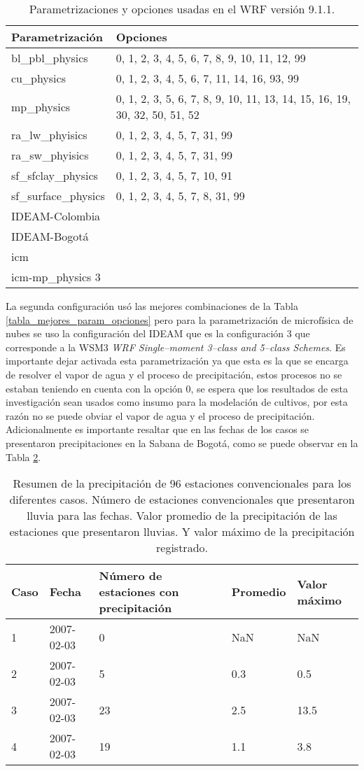 \begin{itemize}
\begin{table}[H]
\caption{Parametrizaciones y opciones usadas en el WRF versión 9.1.1.}
\label{tabla_parametrizacion_opciones_2}
\begin{tabular}{lp{8cm}}
Parametrización & Opciones \\ \hline
bl\_pbl\_physics & 0, 1, 2, 3, 4, 5, 6, 7, 8, 9, 10, 11, 12, 99 \\ %
cu\_physics      & 0, 1, 2, 3, 4, 5, 6, 7, 11, 14, 16, 93, 99 \\ %
mp\_physics      & 0, 1, 2, 3, 5, 6, 7, 8, 9, 10, 11, 13, 14, 15, 16, 19, 30, 32, 50, 51, 52 \\%
ra\_lw\_phyisics & 0, 1, 2, 3, 4, 5, 7, 31, 99 \\%
ra\_sw\_phyisics & 0, 1, 2, 3, 4, 5, 7, 31, 99 \\%
sf\_sfclay\_physics & 0, 1, 2, 3, 4, 5, 7, 10, 91\\ %
sf\_surface\_physics & 0, 1, 2, 3, 4, 5, 7, 8, 31, 99\\ %
IDEAM-Colombia & \\
IDEAM-Bogotá & \\ 
icm & \\ 
icm-mp\_physics 3 &
\end{tabular}
\end{table}

La segunda configuración usó las mejores combinaciones de la Tabla \ref{tabla_mejores_param_opciones} pero para la parametrización de microfísica de nubes se uso la configuración del IDEAM que es la configuración 3 que corresponde a la WSM3 \textit{WRF Single–moment 3–class and 5–class Schemes}. Es importante dejar activada esta parametrización ya que esta es la que se encarga de resolver el vapor de agua y el proceso de precipitación, estos procesos no se estaban teniendo en cuenta con la opción 0, se espera que los resultados de esta investigación sean usados como insumo para la modelación de cultivos, por esta razón no se puede obviar el vapor de agua y el proceso de precipitación. Adicionalmente es importante resaltar que en las fechas de los casos se presentaron precipitaciones en la Sabana de Bogotá, como se puede observar en la Tabla \ref{tabla_lluvias}. \\

\begin{table}[H]
\centering
\caption{Resumen de la precipitación de 96 estaciones convencionales para los diferentes casos. Número de estaciones convencionales que presentaron lluvia para las fechas. Valor promedio de la precipitación de las estaciones que presentaron lluvias. Y valor máximo de la precipitación registrado.}
\label{tabla_lluvias}
\begin{tabular}{llp{4cm}ll}
Caso & Fecha & Número de estaciones con precipitación & Promedio & Valor máximo \\ \hline
	1 & 2007-02-03 & 0  & NaN & NaN \\
	2 & 2007-02-03 & 5  & 0.3 & 0.5 \\
	3 & 2007-02-03 & 23 & 2.5 & 13.5\\
	4 & 2007-02-03 & 19 & 1.1 & 3.8 \\


\end{tabular}
\end{table}
\end{itemize}
